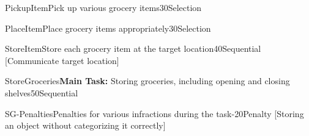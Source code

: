 
\begin{Group}{PickupItem}{Pick up various grocery items}{30}{Selection}
\end{Group}

\begin{Group}{PlaceItem}{Place grocery items appropriately}{30}{Selection}
\end{Group}

\begin{Group}{StoreItem}{Store each grocery item at the target location}{40}{Sequential}
    [Communicate target location]
\end{Group}

\begin{Group}{StoreGroceries}{\textbf{\textcolor{myturquoise}{Main Task:}} Storing groceries, including opening and closing shelves}{50}{Sequential}
\end{Group}

\begin{Group}{SG-Penalties}{Penalties for various infractions during the task}{-20}{Penalty}
    [Storing an object without categorizing it correctly]
\end{Group}
